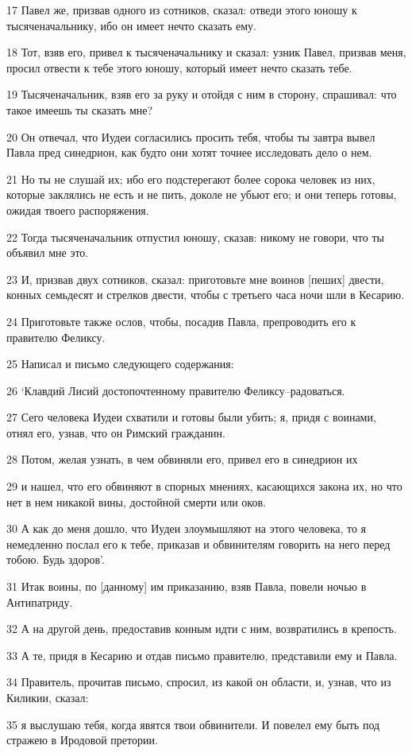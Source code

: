 \par 17 Павел же, призвав одного из сотников, сказал: отведи этого юношу к тысяченачальнику, ибо он имеет нечто сказать ему.
\par 18 Тот, взяв его, привел к тысяченачальнику и сказал: узник Павел, призвав меня, просил отвести к тебе этого юношу, который имеет нечто сказать тебе.
\par 19 Тысяченачальник, взяв его за руку и отойдя с ним в сторону, спрашивал: что такое имеешь ты сказать мне?
\par 20 Он отвечал, что Иудеи согласились просить тебя, чтобы ты завтра вывел Павла пред синедрион, как будто они хотят точнее исследовать дело о нем.
\par 21 Но ты не слушай их; ибо его подстерегают более сорока человек из них, которые заклялись не есть и не пить, доколе не убьют его; и они теперь готовы, ожидая твоего распоряжения.
\par 22 Тогда тысяченачальник отпустил юношу, сказав: никому не говори, что ты объявил мне это.
\par 23 И, призвав двух сотников, сказал: приготовьте мне воинов [пеших] двести, конных семьдесят и стрелков двести, чтобы с третьего часа ночи шли в Кесарию.
\par 24 Приготовьте также ослов, чтобы, посадив Павла, препроводить его к правителю Феликсу.
\par 25 Написал и письмо следующего содержания:
\par 26 `Клавдий Лисий достопочтенному правителю Феликсу--радоваться.
\par 27 Сего человека Иудеи схватили и готовы были убить; я, придя с воинами, отнял его, узнав, что он Римский гражданин.
\par 28 Потом, желая узнать, в чем обвиняли его, привел его в синедрион их
\par 29 и нашел, что его обвиняют в спорных мнениях, касающихся закона их, но что нет в нем никакой вины, достойной смерти или оков.
\par 30 А как до меня дошло, что Иудеи злоумышляют на этого человека, то я немедленно послал его к тебе, приказав и обвинителям говорить на него перед тобою. Будь здоров'.
\par 31 Итак воины, по [данному] им приказанию, взяв Павла, повели ночью в Антипатриду.
\par 32 А на другой день, предоставив конным идти с ним, возвратились в крепость.
\par 33 А те, придя в Кесарию и отдав письмо правителю, представили ему и Павла.
\par 34 Правитель, прочитав письмо, спросил, из какой он области, и, узнав, что из Киликии, сказал:
\par 35 я выслушаю тебя, когда явятся твои обвинители. И повелел ему быть под стражею в Иродовой претории.

